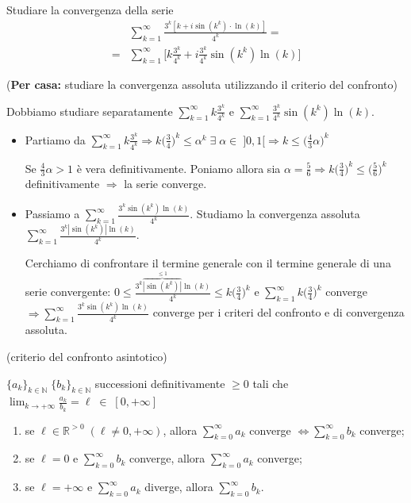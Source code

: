 \begin{exbar}
	\begin{example} Studiare la convergenza della serie 
		\begin{align*}
			&\sum_{k=1}^\infty \frac{3^k [k + i\sin(k^k)\cdot\ln(k) ]}{4^k} = \\
			=& \sum_{k=1}^{\infty} \bigg[k\frac{3^k}{4^k} + i \frac{3^k}{4^k} \sin(k^k) \ln(k) \bigg]
		\end{align*}
		
		(\textbf{Per casa:} studiare la convergenza assoluta utilizzando il criterio del confronto)
		
		Dobbiamo studiare separatamente $\sum_{k=1}^{\infty} k\frac{3^k}{4^k}$ e $\sum_{k=1}^{\infty} \frac{3^k}{4^k} \sin(k^k) \ln(k)$.
		
		\begin{itemize}
			\item Partiamo da $\sum_{k=1}^\infty k\frac{3^k}{4^k} \Rightarrow k \bigg(\frac{3}{4} \bigg)^k \leq \alpha^k \; \exists \; \alpha \in \; ]0,1[ \Rightarrow k\leq \bigg(\frac{4}{3} \alpha \bigg)^k$
			
			Se $\frac{4}{3} \alpha > 1$ è vera definitivamente. Poniamo allora sia $\alpha=\frac{5}{6} \Rightarrow k\bigg(\frac{3}{4} \bigg)^k \leq \bigg(\frac{5}{6} \bigg)^k$ definitivamente $\Rightarrow$ la serie converge. 
			
			\item Passiamo a $\sum_{k=1}^\infty \frac{3^k \sin(k^k)\ln(k)}{4^k}$. Studiamo la convergenza assoluta $\sum_{k=1}^\infty \frac{3^k |\sin(k^k)|\ln(k)}{4^k}$. 
			
			Cerchiamo di confrontare il termine generale con il termine generale di una serie convergente:
			$0 \leq \frac{3^k \overbrace{|\sin(k^k)|}^{\leq 1} \ln(k)}{4^k} \leq k \bigg(\frac{3}{4} \bigg)^k$ e $\sum_{k=1}^\infty k \bigg(\frac{3}{4}\bigg)^k$ converge $\Rightarrow \sum_{k=1}^\infty \frac{3^k \sin(k^k)\ln(k)}{4^k}$ converge per i criteri del confronto e di convergenza assoluta.
		\end{itemize}
	\end{example}
\end{exbar}

\begin{theorem} (criterio del confronto asintotico)
	\label{th:confronto asintotico}
	
	$\{a_k \}_{k\in\mathbb{N}} \; \{b_k \}_{k\in\mathbb{N}}$ successioni definitivamente $\geq 0$ tali che $\lim_{k\rightarrow+\infty} \frac{a_k}{b_k} = \ell \; \in \; [0,+\infty]$
	\begin{enumerate}
		\item se $\ell\in\mathbb{R}^{>0} \; (\ell\neq0,+\infty)$, allora $\sum_{k=0}^\infty a_k$ converge $\iff \sum_{k=0}^\infty b_k$ converge;
		\item se $\ell = 0$ e $\sum_{k=0}^\infty b_k$ converge, allora $\sum_{k=0}^\infty a_k$ converge;
		\item se $\ell = +\infty$ e $\sum_{k=0}^\infty a_k$ diverge, allora $\sum_{k=0}^\infty b_k$.
	\end{enumerate}
\end{theorem}

